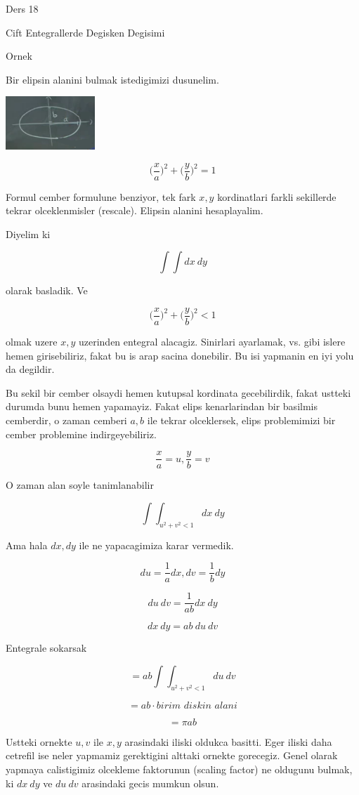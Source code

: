 \documentclass[12pt,fleqn]{article}\usepackage{../common}
\begin{document}
Ders 18

Cift Entegrallerde Degisken Degisimi 

Ornek 

Bir elipsin alanini bulmak istedigimizi dusunelim. 

\includegraphics[height=2cm]{18_1.png}

\[ \bigg(\frac{x}{a}\bigg)^2 + \bigg(\frac{y}{b}\bigg)^2 = 1 \]

Formul cember formulune benziyor, tek fark $x,y$ kordinatlari farkli
sekillerde tekrar olceklenmisler (rescale). Elipsin alanini hesaplayalim. 

Diyelim ki 

\[ \int \int dx \ dy \]

olarak basladik. Ve

\[ \bigg(\frac{x}{a}\bigg)^2 + \bigg(\frac{y}{b}\bigg)^2 < 1 \]

olmak uzere $x,y$ uzerinden entegral alacagiz. Sinirlari ayarlamak,
vs. gibi islere hemen girisebiliriz, fakat bu is arap sacina donebilir. Bu
isi yapmanin en iyi yolu da degildir. 

Bu sekil bir cember olsaydi hemen kutupsal kordinata gecebilirdik, fakat
ustteki durumda bunu hemen yapamayiz. Fakat elips kenarlarindan bir basilmis
cemberdir, o zaman cemberi $a,b$ ile tekrar olceklersek, elips problemimizi
bir cember problemine indirgeyebiliriz. 

\[ \frac{x}{a} = u, \frac{y}{b} = v \]

O zaman alan soyle tanimlanabilir 

\[ \int \int_{u^2 + v^2 < 1} dx \ dy \]

Ama hala $dx,dy$ ile ne yapacagimiza karar vermedik. 

\[ du = \frac{1}{a}dx,dv = \frac{1}{b}dy \]

\[ du \ dv = \frac{1}{ab}dx \ dy \]

\[ dx \ dy = ab \ du \ dv \]

Entegrale sokarsak

\[ = ab \int \int_{u^2 + v^2 < 1} du \ dv \]

\[ = ab \cdot \textit{birim diskin alani} \]

\[ = \pi ab \]

Ustteki ornekte $u,v$ ile $x,y$ arasindaki iliski oldukca basitti. Eger
iliski daha cetrefil ise neler yapmamiz gerektigini alttaki ornekte
gorecegiz. Genel olarak yapmaya calistigimiz olcekleme faktorunun (scaling
factor) ne oldugunu bulmak, ki $dx \ dy$ ve $du \ dv$ arasindaki gecis
mumkun olsun.
\end{document}
